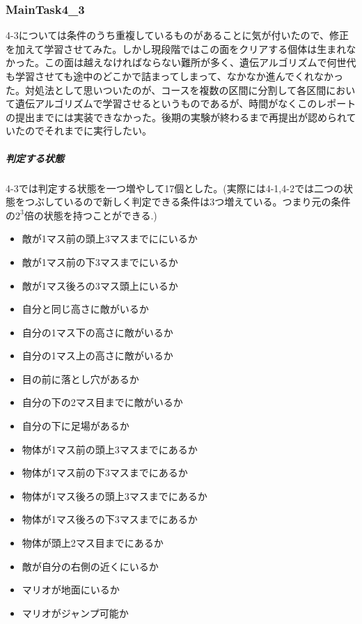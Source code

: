 \documentclass{jsarticle}
\begin{document}
\subsubsection{MainTask4\_3}
4-3については条件のうち重複しているものがあることに気が付いたので、修正を加えて学習させてみた。しかし現段階ではこの面をクリアする個体は生まれなかった。この面は越えなければならない難所が多く、遺伝アルゴリズムで何世代も学習させても途中のどこかで詰まってしまって、なかなか進んでくれなかった。対処法として思いついたのが、コースを複数の区間に分割して各区間において遺伝アルゴリズムで学習させるというものであるが、時間がなくこのレポートの提出までには実装できなかった。後期の実験が終わるまで再提出が認められていたのでそれまでに実行したい。
\subparagraph{判定する状態}
4-3では判定する状態を一つ増やして17個とした。(実際には4-1,4-2では二つの状態をつぶしているので新しく判定できる条件は3つ増えている。つまり元の条件の$2^3$倍の状態を持つことができる.)
\begin{itemize}
	\item{敵が1マス前の頭上3マスまでににいるか}
	\item{敵が1マス前の下3マスまでにいるか}
	\item{敵が1マス後ろの3マス頭上にいるか}
	\item{自分と同じ高さに敵がいるか}
	\item{自分の1マス下の高さに敵がいるか}
	\item{自分の1マス上の高さに敵がいるか}
	\item{目の前に落とし穴があるか}
	\item{自分の下の2マス目までに敵がいるか}
	\item{自分の下に足場があるか}
	\item{物体が1マス前の頭上3マスまでにあるか}
	\item{物体が1マス前の下3マスまでにあるか}
	\item{物体が1マス後ろの頭上3マスまでにあるか}
	\item{物体が1マス後ろの下3マスまでにあるか}
	\item{物体が頭上2マス目までにあるか}
	\item{敵が自分の右側の近くにいるか}
	\item{マリオが地面にいるか}
	\item{マリオがジャンプ可能か}
\end{itemize}
\end{document}
